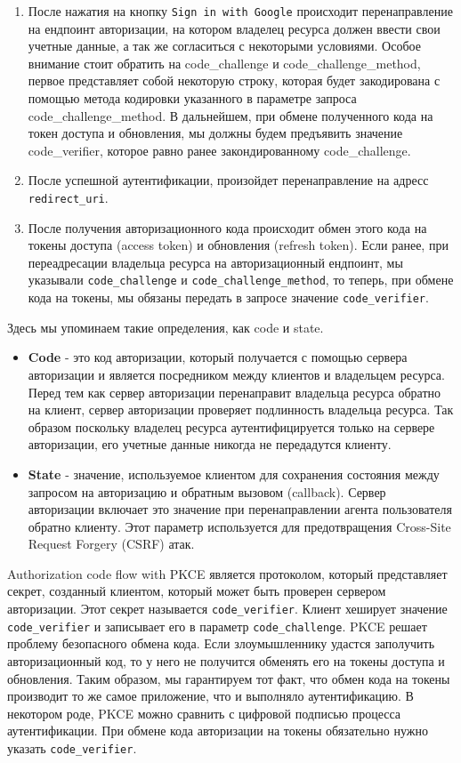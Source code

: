 \begin{enumerate}
    \item После нажатия на кнопку \texttt{Sign in with Google} происходит перенаправление на ендпоинт авторизации,
    на котором владелец ресурса должен ввести свои учетные данные, а так же согласиться с некоторыми условиями.
    Особое внимание стоит обратить на code\_challenge и code\_challenge\_method, первое представляет собой некоторую строку,
    которая будет закодирована с помощью метода кодировки указанного в параметре запроса code\_challenge\_method.
    В дальнейшем, при обмене полученного кода на токен доступа и обновления, мы должны будем предъявить значение code\_verifier,
    которое равно ранее закондированному code\_challenge.
    \item После успешной аутентификации, произойдет перенаправление на адресс \texttt{redirect\_uri}.
    \item После получения авторизационного кода происходит обмен этого кода на токены доступа (access token) и
    обновления (refresh token).
    Если ранее, при переадресации владельца ресурса на авторизационный ендпоинт, мы указывали \texttt{code\_challenge}
    и \texttt{code\_challenge\_method},
    то теперь, при обмене кода на токены, мы обязаны передать в запросе значение \texttt{code\_verifier}.
\end{enumerate}
Здесь мы упоминаем такие определения, как code и state.
\begin{itemize}
    \item \textbf{Code} - это код авторизации, который получается с помощью сервера авторизации и является посредником
    между клиентов и владельцем ресурса.
    Перед тем как сервер авторизации перенаправит владельца ресурса обратно на клиент, сервер авторизации проверяет
    подлинность владельца ресурса.
    Так образом поскольку владелец ресурса аутентифицируется только на сервере авторизации, его учетные данные никогда
    не передадутся клиенту.
    \item \textbf{State} - значение, используемое клиентом для сохранения состояния между запросом на авторизацию и
    обратным вызовом (callback).
    Сервер авторизации включает это значение при перенаправлении агента пользователя обратно клиенту.
    Этот параметр используется для предотвращения Cross-Site Request Forgery (CSRF) атак.
\end{itemize}

Authorization code flow with PKCE является протоколом, который представляет секрет, созданный клиентом,
который может быть проверен сервером авторизации.
Этот секрет называется \texttt{code\_verifier}.
Клиент хеширует значение \texttt{code\_verifier} и записывает его в параметр \texttt{code\_challenge}.
PKCE решает проблему безопасного обмена кода.
Если злоумышленнику удастся заполучить авторизационный код, то у него не получится обменять
его на токены доступа и обновления.
Таким образом, мы гарантируем тот факт, что обмен кода на токены производит то же самое приложение, что и выполняло
аутентификацию.
В некотором роде, PKCE можно сравнить с цифровой подписью процесса аутентификации.
При обмене кода авторизации на токены обязательно нужно указать \texttt{code\_verifier}.